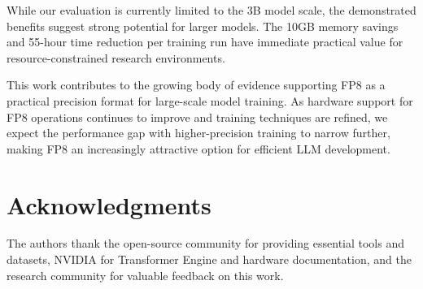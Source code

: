 \documentclass[conference]{IEEEtran}
\begin{document}
While our evaluation is currently limited to the 3B model scale, the demonstrated benefits suggest strong potential for larger models. The 10GB memory savings and 55-hour time reduction per training run have immediate practical value for resource-constrained research environments.

This work contributes to the growing body of evidence supporting FP8 as a practical precision format for large-scale model training. As hardware support for FP8 operations continues to improve and training techniques are refined, we expect the performance gap with higher-precision training to narrow further, making FP8 an increasingly attractive option for efficient LLM development.

\section*{Acknowledgments}

The authors thank the open-source community for providing essential tools and datasets, NVIDIA for Transformer Engine and hardware documentation, and the research community for valuable feedback on this work.
\end{document}
